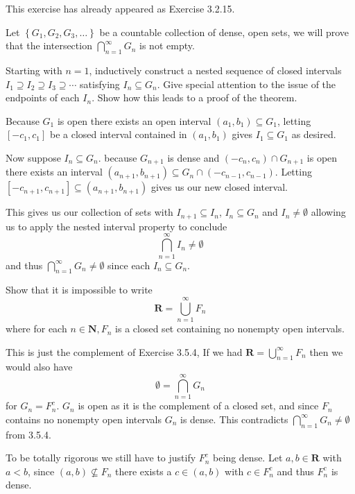 \begin{solution}
  This exercise has already appeared as Exercise 3.2.15.
\end{solution}

\begin{exercise}
  Let $\left\{G_{1}, G_{2}, G_{3}, \ldots\right\}$ be a countable collection of dense, open sets, we will prove that the intersection $\bigcap_{n=1}^{\infty} G_{n}$ is not empty.

  Starting with $n=1$, inductively construct a nested sequence of closed intervals $I_{1} \supseteq I_{2} \supseteq I_{3} \supseteq \cdots$ satisfying $I_{n} \subseteq G_{n}$. Give special attention to the issue of the endpoints of each $I_{n}$. Show how this leads to a proof of the theorem.
\end{exercise}

\begin{solution}
  Because $G_1$ is open there exists an open interval $(a_1,b_1) \subseteq G_1$, letting $[-c_1, c_1]$ be a closed interval contained in $(a_1, b_1)$ gives $I_1 \subseteq G_1$ as desired.

  Now suppose $I_{n} \subseteq G_{n}$. because $G_{n+1}$ is dense and $(-c_{n}, c_{n}) \cap G_{n+1}$ is open there exists an interval $(a_{n+1}, b_{n+1}) \subseteq G_n \cap (-c_{n-1}, c_{n-1})$. Letting $[-c_{n+1}, c_{n+1}] \subseteq (a_{n+1}, b_{n+1})$ gives us our new closed interval.

  This gives us our collection of sets with $I_{n+1} \subseteq I_n$, $I_n \subseteq G_n$ and $I_n \ne \emptyset$ allowing us to apply the nested interval property to conclude
  $$
  \bigcap_{n=1}^\infty I_n \ne \emptyset
  $$
  and thus $\bigcap_{n=1}^\infty G_n \ne \emptyset$ since each $I_n \subseteq G_n$.
\end{solution}

\begin{exercise}
  Show that it is impossible to write
  $$
  \mathbf{R}=\bigcup_{n=1}^{\infty} F_{n}
  $$
  where for each $n \in \mathbf{N}, F_{n}$ is a closed set containing no nonempty open intervals.
\end{exercise}

\begin{solution}
  This is just the complement of Exercise 3.5.4, If we had $\mathbf R = \bigcup_{n=1}^\infty F_n$ then we would also have
  $$\emptyset = \bigcap_{n=1}^\infty G_n$$
  for $G_n = F_n^c$. $G_n$ is open as it is the complement of a closed set, and since $F_n$ contains no nonempty open intervals $G_n$ is dense. This contradicts $\bigcap_{n=1}^\infty G_n \ne \emptyset$  from 3.5.4.

  To be totally rigorous we still have to justify $F_n^c$ being dense. Let $a,b \in \mathbf{R}$ with $a < b$, since $(a,b) \not \subseteq F_n$ there exists a $c \in (a,b)$ with $c \in F_n^c$ and thus $F_n^c$ is dense.
\end{solution}

